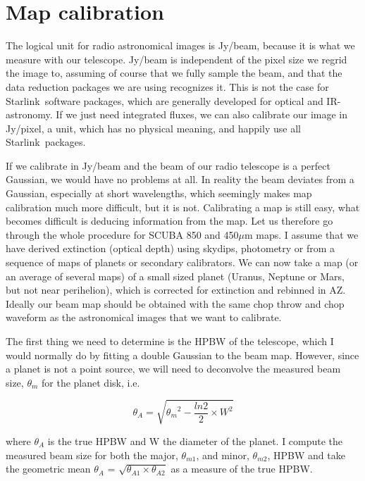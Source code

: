 \documentclass[twoside,11pt]{article}
\newcommand{\starlink}{\htmladdnormallink{Starlink}{http://star-www.rl.ac.uk/}}
\newcommand{\htmladdnormallink}[2]{#1}
\newcommand{\xlabel}[1]{}
\begin{document}
{\section{\xlabel{map_callibration}Map calibration}

The logical unit for radio astronomical images is Jy/beam, because
it is what we measure with our telescope. Jy/beam is independent
of the pixel size we regrid the image to, assuming of course that we
fully sample the beam, and that the data reduction packages we are using
recognizes it. This is not the case for \starlink\ software packages, which
are generally developed for optical and IR-astronomy. If we just need
integrated fluxes, we can also calibrate our image in Jy/pixel,
a unit, which has no physical meaning, and happily use all \starlink\
packages.

If we calibrate in Jy/beam and the beam of our radio telescope is
a perfect Gaussian, we would have no problems at all. In reality the beam
deviates from a Gaussian, especially at short wavelengths, which seemingly
makes map calibration much more difficult, but it is not. Calibrating
a map is still easy, what becomes difficult is deducing information
from the map.  Let us therefore go through the whole procedure for
SCUBA 850 and 450$\mu$m maps. I assume that we have derived extinction
(optical depth) using skydips, photometry or from a sequence of maps of
planets or secondary calibrators. We can now take a map (or an average
of several maps) of a small sized planet (Uranus, Neptune or Mars, but
not near perihelion), which is corrected for extinction and rebinned in
AZ. Ideally our beam map should be obtained with the same chop throw and
chop waveform as the astronomical images that we want to calibrate.

The first thing we need to determine is the HPBW of the telescope,
which I would normally do by fitting a  double Gaussian to the beam
map. However, since a planet is not a point source, we will need to
deconvolve the measured beam size, $\theta_m$ for the planet disk, i.e.

\begin{equation}
\theta_{A} = \sqrt{{\theta_m}^{2} - \frac{ln2}{2} \times W^{2} }
\end{equation}

where $\theta_A$ is the true HPBW and W the diameter of the planet. I
compute the measured beam size for both the major, $\theta_{m1}$, and
minor, $\theta_{m2}$, HPBW and take the geometric mean $\theta_{A}$ =
$\sqrt{\theta_{A1} \times \theta_{A2}}$ as a measure of the true HPBW.

}
\end{document}
